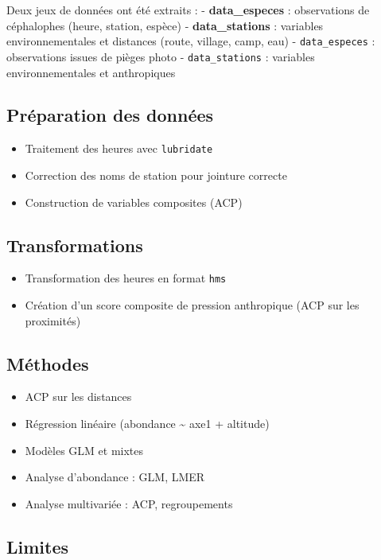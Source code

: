 \documentclass[
]{article}
\providecommand{\tightlist}{%
  \setlength{\itemsep}{0pt}\setlength{\parskip}{0pt}}
\begin{document}
Deux jeux de données ont été extraits :
- \textbf{data\_especes} : observations de céphalophes (heure, station, espèce)
- \textbf{data\_stations} : variables environnementales et distances (route, village, camp, eau)
- \texttt{data\_especes} : observations issues de pièges photo
- \texttt{data\_stations} : variables environnementales et anthropiques

\subsection{Préparation des données}\label{pruxe9paration-des-donnuxe9es-1}

\begin{itemize}
\tightlist
\item
  Traitement des heures avec \texttt{lubridate}
\item
  Correction des noms de station pour jointure correcte
\item
  Construction de variables composites (ACP)
\end{itemize}

\subsection{Transformations}\label{transformations}

\begin{itemize}
\tightlist
\item
  Transformation des heures en format \texttt{hms}
\item
  Création d'un score composite de pression anthropique (ACP sur les proximités)
\end{itemize}

\subsection{Méthodes}\label{muxe9thodes}

\begin{itemize}
\item
  ACP sur les distances
\item
  Régression linéaire (abondance \textasciitilde{} axe1 + altitude)
\item
  Modèles GLM et mixtes
\item
  Analyse d'abondance : GLM, LMER
\item
  Analyse multivariée : ACP, regroupements
\end{itemize}

\subsection{Limites}\label{limites-1}
\end{document}
